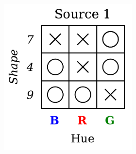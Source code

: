 \begin{definition}
\begin{figure}[H]
        \begin{subfigure}[b]{0.45\textwidth}
            \centering
            \begin{subfigure}[b]{0.48\textwidth}
                \centering
                \includegraphics[width=\textwidth]{img/datasets/1-CGO_fact=hue_env=0.pdf}
            \end{subfigure}
            \begin{subfigure}[b]{0.48\textwidth}
                \centering

\end{subfigure}
\end{subfigure}
\end{figure}
\end{definition}

